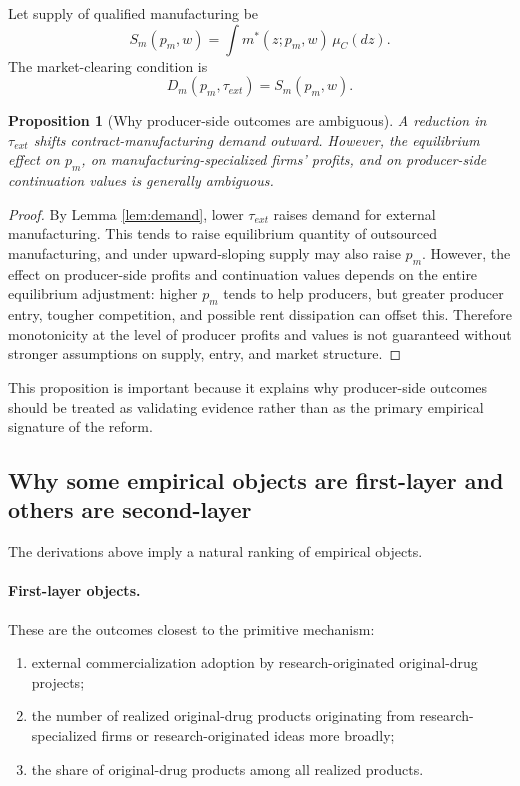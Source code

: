\documentclass[12pt]{article}
\newtheorem{proposition}{Proposition}
\begin{document}
Let supply of qualified manufacturing be
\[
S_m(p_m,w)=\int m^*(z;p_m,w)\,\mu_C(dz).
\]
The market-clearing condition is
\[
D_m(p_m,\tau_{ext})=S_m(p_m,w).
\]

\begin{proposition}[Why producer-side outcomes are ambiguous]
\label{prop:amb}
A reduction in \(\tau_{ext}\) shifts contract-manufacturing demand outward. However, the equilibrium effect on \(p_m\), on manufacturing-specialized firms' profits, and on producer-side continuation values is generally ambiguous.
\end{proposition}

\begin{proof}
By Lemma \ref{lem:demand}, lower \(\tau_{ext}\) raises demand for external manufacturing. This tends to raise equilibrium quantity of outsourced manufacturing, and under upward-sloping supply may also raise \(p_m\). However, the effect on producer-side profits and continuation values depends on the entire equilibrium adjustment:
higher \(p_m\) tends to help producers, but greater producer entry, tougher competition, and possible rent dissipation can offset this. Therefore monotonicity at the level of producer profits and values is not guaranteed without stronger assumptions on supply, entry, and market structure.
\end{proof}

This proposition is important because it explains why producer-side outcomes should be treated as validating evidence rather than as the primary empirical signature of the reform.

\subsection{Why some empirical objects are first-layer and others are second-layer}

The derivations above imply a natural ranking of empirical objects.

\paragraph{First-layer objects.}
These are the outcomes closest to the primitive mechanism:
\begin{enumerate}[label=(\roman*),leftmargin=2em]
    \item external commercialization adoption by research-originated original-drug projects;
    \item the number of realized original-drug products originating from research-specialized firms or research-originated ideas more broadly;
    \item the share of original-drug products among all realized products.
\end{enumerate}
\end{document}
